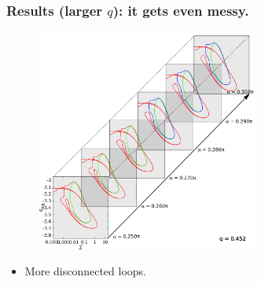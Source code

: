 \documentclass{beamer}
\newcommand{\bi}{\begin{itemize}}
\newcommand{\ei}{\end{itemize}}
\begin{document}
\begin{frame}
	\frametitle{Results (larger $q$): it gets even messy.}
	\begin{overlayarea}{\textwidth}{\textheight}\vspace{-0.3cm}
		\begin{figure}[htb]
			\begin{center}
				\includegraphics[width=0.65\textwidth]{plots/elastic_beam_I_theta_q_0.452_alpha_restart2.png}
			\end{center}
		\end{figure}\vspace{-0.3cm}
		\bi
		\item More disconnected loops.
		\ei 
	\end{overlayarea}
\end{frame}


\end{document}
